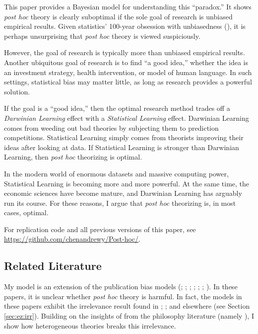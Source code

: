 \documentclass[12pt,english]{article}
\theoremstyle{plain}
\theoremstyle{plain}
\begin{document}
This paper provides a Bayesian model for understanding this ``paradox.'' It shows \emph{post hoc} theory is clearly suboptimal if the sole goal of research is unbiased empirical results. Given statistics' 100-year obsession with unbiasedness (\citet{efron2001statistical}), it is perhaps unsurprising that \emph{post hoc} theory is viewed suspiciously.

However, the goal of research is typically more than unbiased empirical results. Another ubiquitous goal of research is to find ``a good idea,'' whether the idea is an investment strategy, health intervention, or model of human language. In such settings, statistical bias may matter little, as long as research provides a powerful solution.

If the goal is a ``good idea,'' then the optimal research method trades off a \emph{Darwinian Learning} effect with a \emph{Statistical Learning} effect. Darwinian Learning comes from weeding out bad theories by subjecting them to prediction competitions. Statistical Learning simply comes from theorists improving their ideas after looking at data. If Statistical Learning is stronger than Darwinian Learning, then \emph{post hoc} theorizing is optimal.

In the modern world of enormous datasets and massive computing power, Statistical Learning is becoming more and more powerful. At the same time, the economic sciences have become mature, and Darwinian Learning has arguably run its course. For these reasons, I argue that \emph{post hoc} theorizing is, in most cases, optimal.

For replication code and all previous versions of this paper, see \url{https://github.com/chenandrewy/Post-hoc/}.

\subsection{Related Literature}

My model is an extension of the publication bias models (\citet{hedges1984estimation}; \citet{brodeur2016star}; \citet{andrews2019identification}; \citet{abadie2020statistical}; \citet{chen2020publication}; \citet{jensen2023there}; \citet{kasy2024optimal}). In these papers, it is unclear whether \emph{post hoc} theory is harmful. In fact, the models in these papers exhibit the irrelevance result found in \citet{hempel1966philosophy}; \citet{lakatos1970methodology}; and elsewhere (see Section \ref{sec:ez:irr}). Building on the insights of from the philosophy literature (namely \citealt{maher1988prediction}), I show how heterogeneous theories breaks this irrelevance. 
\end{document}
